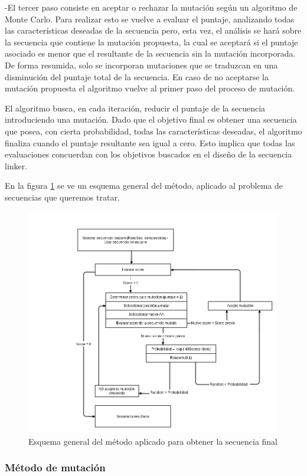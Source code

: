     -El tercer paso consiste en aceptar o rechazar la mutación según un algoritmo de Monte Carlo. Para realizar esto se vuelve a evaluar el puntaje, analizando todas las características deseadas de la secuencia pero, esta vez, el análisis se hará sobre la secuencia que contiene la mutación propuesta, la cual se aceptará si el puntaje asociado es menor que el  resultante de la secuencia sin la mutación incorporada. De forma resumida, solo se incorporan mutaciones que se traduzcan en una disminución del puntaje total de la secuencia.
En caso de no aceptarse la mutación propuesta el algoritmo vuelve al primer paso del proceso de mutación.

El algoritmo busca, en cada iteración, reducir el puntaje de la secuencia introduciendo una mutación. Dado que el objetivo final es obtener una secuencia que posea, con cierta probabilidad, todas las características deseadas, el algoritmo finaliza cuando el puntaje resultante sea igual a cero. Esto implica que todas las evaluaciones concuerdan con los objetivos buscados en el diseño de la secuencia linker.


En la figura \ref{fig:esquema-algoritmo} se ve un esquema general del método, aplicado al problema de secuencias que queremos tratar.



\begin{figure}[htbp]
\centering
   \includegraphics[width=\textwidth]{img/diagrama-algoritmo.png}
 \caption{Esquema general del método aplicado para obtener la secuencia final}
 \label{fig:esquema-algoritmo}
\end{figure}



\subsubsection{Método de mutación}

